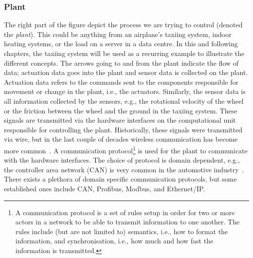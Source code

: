 \subsubsection{Plant}%
%
The right part of the figure depict the process we are trying to control (denoted the \emph{plant}).
This could be anything from an airplane's taxiing system, indoor heating systems, or the load on a server in a data centre.
In this and following chapters, the taxiing system will be used as a recurring example to illustrate the different concepts.
The arrows going to and from the plant indicate the flow of data; actuation data goes into the plant and sensor data is collected on the plant.
Actuation data refers to the commands sent to the components responsible for movement or change in the plant, i.e., the actuators.
Similarly, the sensor data is all information collected by the sensors, e.g., the rotational velocity of the wheel or the friction between the wheel and the ground in the taxiing system.
These signals are transmitted via the hardware interfaces on the computational unit responsible for controlling the plant.
Historically, these signals were transmitted via wire, but in the last couple of decades wireless communication has become more common~\addref{}.
A communication protocol\footnote{A communication protocol is a set of rules setup in order for two or more actors in a network to be able to transmit information to one another. The rules include (but are not limited to) semantics, i.e., how to format the information, and synchronisation, i.e., how much and how fast the information is transmitted.} is used for the plant to communicate with the hardware interfaces.
The choice of protocol is domain dependent, e.g., the controller area network (CAN) is very common in the automotive industry~\addref{}.
There exists a plethora of domain specific communication protocols, but some established ones include CAN, Profibus, Modbus, and Ethernet/IP.

